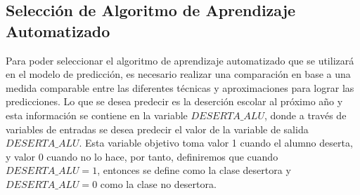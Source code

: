 \subsection{Selección de Algoritmo de Aprendizaje Automatizado}
Para poder seleccionar el algoritmo de aprendizaje automatizado que se utilizará en el modelo de predicción, es necesario realizar una comparación en base a una medida comparable entre las diferentes técnicas y aproximaciones para lograr las predicciones. Lo que se desea predecir es la deserción escolar al próximo año y esta información se contiene en la variable $DESERTA\_ALU$, donde a través de variables de entradas se desea predecir el valor de la variable de salida $DESERTA\_ALU$. Esta variable objetivo toma valor 1 cuando el alumno deserta, y valor 0 cuando no lo hace, por tanto, definiremos que cuando $DESERTA\_ALU = 1$, entonces se define como la clase desertora y $DESERTA\_ALU = 0$ como la clase no desertora.

